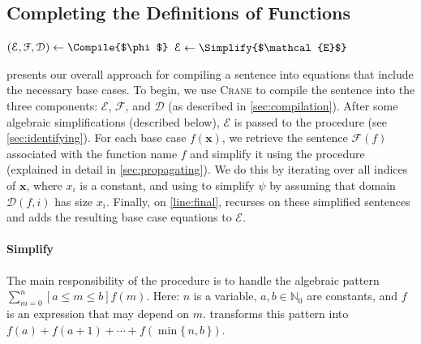 \documentclass[a4paper,UKenglish,cleveref, autoref, thm-restate]{lipics-v2021}
\begin{document}
\subsection{Completing the Definitions of Functions}\label{sec:completing}

\begin{algorithm}[t]
  \caption{\protect\CompileWithBaseCases{$\phi$}}\label{alg:compilewithbasecases}
  $(\mathcal{E}, \mathcal{F}, \mathcal{D}) \gets \Compile{$\phi$}$\;
  $\mathcal{E} \gets \Simplify{$\mathcal{E}$}$\;\label{line:second}
\end{algorithm}

 presents our overall approach for compiling a
sentence into equations that include the necessary base cases. To begin, we use
\textsc{Crane} to compile the sentence into the three components: $\mathcal{E}$,
$\mathcal{F}$, and $\mathcal{D}$ (as described in \cref{sec:compilation}). After
some algebraic simplifications (described below), $\mathcal{E}$ is passed to the
\FindBaseCases procedure (see \cref{sec:identifying}). For each base case
$f(\mathbf{x})$, we retrieve the sentence $\mathcal{F}(f)$ associated with the
function name $f$ and simplify it using the \Propagate procedure (explained in
detail in \cref{sec:propagating}). We do this by iterating over all indices of
$\mathbf{x}$, where $x_{i}$ is a constant, and using \Propagate to simplify
$\psi$ by assuming that domain $\mathcal{D}(f, i)$ has size $x_{i}$. Finally, on
\autoref{line:final}, \CompileWithBaseCases recurses on these simplified
sentences and adds the resulting base case equations to $\mathcal{E}$.

\paragraph*{Simplify}
The main responsibility of the \Simplify procedure is to handle the algebraic
pattern $\sum_{m=0}^{n}[a \le m \le b] f(m)$. Here: $n$ is a variable,
$a, b \in \mathbb{N}_{0}$ are constants, and $f$ is an expression that may
depend on $m$. \Simplify transforms this pattern into
$f(a) + f(a+1) + \cdots + f(\min\{\, n, b \,\})$.
\end{document}
